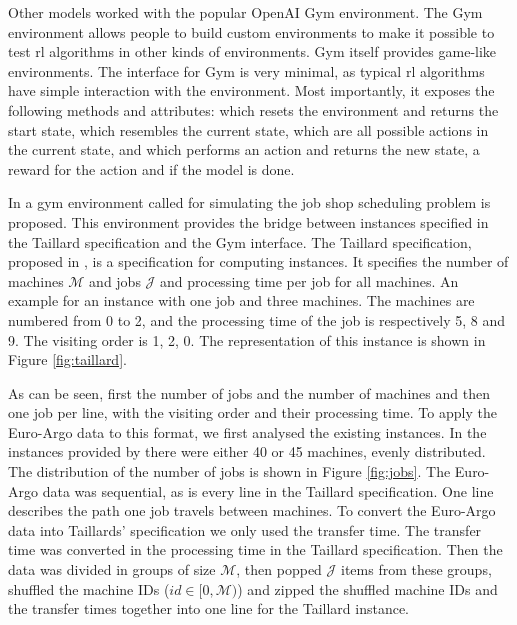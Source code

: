 Other models worked with the popular OpenAI Gym environment. The Gym
environment allows people to build custom environments to make it possible to
test \gls{rl} algorithms in other kinds of environments. Gym itself provides
game-like environments. The interface for Gym is very minimal, as typical
\gls{rl}
algorithms have simple interaction with the environment. Most importantly, it
exposes the following methods and attributes:  which resets
the environment and returns the start state, 
which resembles the current state,  which are all
possible actions in the current state, and  which
performs an action and returns the new state, a reward for the action and if
the model is done.

In  a gym environment called  for simulating
the job shop scheduling problem is proposed. This environment provides the
bridge between instances specified in the Taillard specification and the Gym
interface. The Taillard specification, proposed in , is a
specification for computing instances. It specifies the number of machines
$\mathcal{M}$ and jobs $\mathcal{J}$ and processing time per job for all
machines. An example for an instance with one job and three machines. The
machines are numbered from 0 to 2, and the processing time of the job is
respectively 5, 8 and 9. The visiting order is 1, 2, 0. The representation of
this instance is shown in Figure \ref{fig:taillard}.



As can be seen, first the number of jobs and the number of machines and then
one job per line, with the visiting order and their processing time. To apply
the Euro-Argo data to this format, we first analysed the existing instances.
In the instances provided by  there were either 40 or 45
machines, evenly distributed. The distribution of the number of jobs is shown
in Figure \ref{fig:jobs}. The Euro-Argo data was sequential, as is every line
in the Taillard specification. One line describes the path one job travels
between machines. To convert the Euro-Argo data into Taillards' specification
we only used the transfer time. The transfer time was converted in the
processing time in the Taillard specification. Then the data was divided in
groups of size $\mathcal{M}$, then popped $\mathcal{J}$ items from these
groups, shuffled the machine IDs ($id \in [0, \mathcal{M})$) and zipped the
shuffled machine IDs and the transfer times together into one line for the
Taillard instance.


